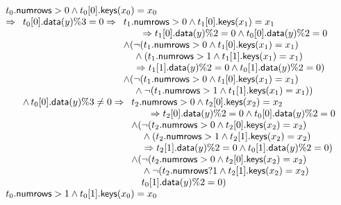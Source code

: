 \documentclass{article}
\newcommand{\NumRows}{\mathsf{numrows}}
\newcommand{\MatchRow}{\mathsf{keys}}
\newcommand{\ActionDataRow}{\mathsf{data}}
\begin{document}
\[
\begin{array}{l}
  t_0.\NumRows > 0 \wedge t_0[0].\MatchRow(x_0) = x_0 \\
  \Rightarrow
  \begin{array}[t]{l}
    t_0[0].\ActionDataRow(y) \% 3 = 0 \Rightarrow
    \begin{array}[t]{l}
      t_1.\NumRows > 0 \wedge t_1[0].\MatchRow(x_1) = x_1 \\
      \qquad \Rightarrow t_1[0].\ActionDataRow(y) \% 2 = 0 \wedge t_0[0].\ActionDataRow(y)\% 2 = 0 \\
      \wedge (\neg (t_1.\NumRows > 0 \wedge t_1[0].\MatchRow(x_1) = x_1) \\
      \phantom{\wedge(}\wedge (t_1.\NumRows > 1 \wedge t_1[1].\MatchRow(x_1) = x_1) \\
      \phantom{\wedge(}\Rightarrow t_1[1].\ActionDataRow(y) \% 2 = 0 \wedge t_0[1].\ActionDataRow(y)\% 2 = 0 )\\
      \wedge (\neg (t_1.\NumRows > 0 \wedge t_1[0].\MatchRow(x_1) = x_1) \\
      \phantom{\wedge (}\wedge \neg (t_1.\NumRows > 1 \wedge t_1[1].\MatchRow(x_1) = x_1)) \\
    \end{array} \\
    \wedge\,t_0[0].\ActionDataRow(y) \% 3 \neq 0 \Rightarrow
    \begin{array}[t]{l}
      t_2.\NumRows > 0 \wedge t_2[0].\MatchRow(x_2) = x_2 \\
      \qquad \Rightarrow t_2[0].\ActionDataRow(y) \% 2 = 0 \wedge t_0[0].\ActionDataRow(y)\% 2 = 0 \\
      \wedge (\neg (t_2.\NumRows > 0 \wedge t_2[0].\MatchRow(x_2) = x_2) \\
      \phantom{\wedge(}\wedge (t_2.\NumRows > 1 \wedge t_2[1].\MatchRow(x_2) = x_2) \\
      \phantom{\wedge(}\Rightarrow t_2[1].\ActionDataRow(y) \% 2 = 0 \wedge t_0[1].\ActionDataRow(y)\% 2 = 0 )\\
      \wedge (\neg (t_2.\NumRows > 0 \wedge t_2[0].\MatchRow(x_2) = x_2) \\
      \phantom{\wedge (}\wedge \neg (t_2.\NumRows ? 1 \wedge t_2[1].\MatchRow(x_2) = x_2) \\
      \phantom{\wedge (} t_0[1].\ActionDataRow(y) \% 2 = 0)
    \end{array}
  \end{array} \\
  t_0.\NumRows > 1 \wedge t_0[1].\MatchRow(x_0) = x_0 \\

\end{array}\]
\end{document}
